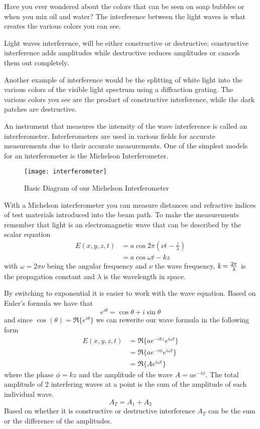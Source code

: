 	Have you ever wondered about the colors that can be seen on soap bubbles or when you mix oil and water? The interference between the light waves is what creates the various colors you can see.

	Light waves interference, will be either constructive or destructive; constructive interference adds amplitudes while destructive reduces amplitudes or cancels them out completely.

	Another example of interference would be the splitting of white light into the various colors of the visible light spectrum using a diffraction grating. The various colors you see are the product of constructive interference, while the dark patches are destructive.

    An instrument that measures the intensity of the wave interference is called an interferometer. Interferometers are used in various fields for accurate measurements due to their accurate measurements. One of the simplest models for an interferometer is the Michelson Interferometer.

\begin{figure}[ht]
\texttt{[image: interferometer]}
\caption{Basic Diagram of our Michelson Interferometer}
\label{fig:interferometerdiagram}
\end{figure}


	With a Michelson interferometer you can measure distances and refractive indices of test materials introduced into the beam path. To make the measurements remember that light is an electromagnetic wave that can be described by the scalar equation
	\begin{align}\label{eqn:EMWave}
		\nonumber E(x,y,z,t) &= a\cos{2\pi(\nu t-\frac{z}{\lambda})} \\
		&= a\cos{\omega t-kz}
	\end{align}
with $\omega=2\pi\nu$ being the angular frequency and $\nu$ the wave frequency, $\emph{k}=\frac{2\pi}{\lambda}$ is the propagation constant and $\lambda$ is the wavelength in space.  

	By switching to exponential it is easier to work with the wave equation. Based on Euler’s formula we have that 
	\begin{equation}\label{eqn:Euler's}
		e^{i\theta} = \cos{\theta} + i \sin{\theta}
	\end{equation}
and since $\cos(\theta)=\Re\{e^{i\theta}\}$ we can rewerite our wave formula in the following form
	\begin{align}\label{eqn:TrigEMWave}
		\nonumber E(x,y,z,t) &=\Re\{a e^{-ikz} e^{i\omega t}\} \\
		\nonumber &=\Re\{a e^{-i\phi} e^{i\omega t}\} \\
		&=\Re\{A e^{i\omega t}\}
	\end{align}
where the phase $\phi=kz$ and the amplitude of the wave $A=ae^{-i\phi}$. The total amplitude of 2 interfering waves at a point is the sum of the amplitude of each individual wave.
	\begin{equation}\label{eqn:Amplitude}
		A_{T}=A_{1}+A_{2}
	\end{equation}
Based on whether it is constructive or destructive interference $A_T$ can be the sum or the difference of the amplitudes. 

